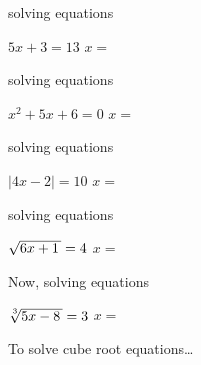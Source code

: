 \vfill 

\begin{tcbraster}[
    raster equal height, 
    raster columns = 2,
    raster column skip = 0.5in,
]
    \begin{tcolorbox}[colback=white,boxrule=0.5pt,]
        \raggedright
        {\small solving  equations \phantom{xxxxxxx}}
        \begin{center}
            \small
            $5x +3 = 13$
            \quad{\large$\Rightarrow$}\quad
            $x =$ 
        \end{center}
    \end{tcolorbox}
    \begin{tcolorbox}[colback=white,boxrule=0.5pt,]
        \raggedright
        {\small solving  equations}
        \begin{center}
            \small
            $x^2 + 5x + 6 = 0$
            \quad{\large$\Rightarrow$}\quad
            $x =$ 
        \end{center}
    \end{tcolorbox}
    \begin{tcolorbox}[colback=white,boxrule=0.5pt,]
        \raggedright
        {\small solving  equations}
        \begin{center}
            \small
            $|4x -2 | = 10$
            \quad{\large$\Rightarrow$}\quad
            $x =$ 
        \end{center}
    \end{tcolorbox}
    \begin{tcolorbox}[colback=white,boxrule=0.5pt,]
        \raggedright
        {\small solving  equations}
        \begin{center}
            \small
            $\myRoot{6x+1} = 4$
            \quad{\large$\Rightarrow$}\quad
            $x =$ 
        \end{center}
    \end{tcolorbox}
\end{tcbraster}

\begin{tcolorbox}[center,width=3.5in,colback=white,boxrule=0.5pt,]
    \raggedright
    {\small Now, solving  equations}
    \begin{center}
        \small
        $\myRoot[3]{5x-8} = 3$
        \quad{\large$\Rightarrow$}\quad
        $x =$ 
    \end{center}
\end{tcolorbox}


\vfill

\begin{myConceptSteps}{To solve cube root equations\dots}
\end{myConceptSteps}


\vfill
{}

